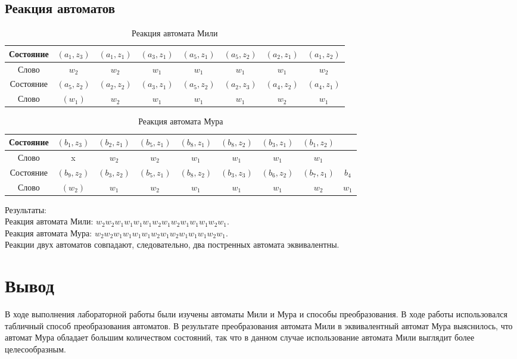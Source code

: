 \documentclass[a4paper,10pt]{article}
\begin{document}
        \subsection*{Реакция автоматов}
        \begin{table}[!h]
            \begin{tabular}{|c|c|c|c|c|c|c|c|}
                \hline
                Состояние & $(a_1, z_3)$& $(a_1, z_1)$ & $(a_3, z_1)$ & $(a_5, z_1)$& $(a_5, z_2)$ & $(a_2, z_1)$ & $(a_1, z_2)$\\ \hline
                Слово     & $w_2$       & $w_2$        & $w_1$ 		  & $w_1$		& $w_1$		   & $w_1$		  & $w_2$ 		\\ \hline
                Состояние & $(a_5,z_2)$ & $(a_2,z_2)$ & $(a_3,z_1)$ & $(a_5,z_2)$ & $(a_2,z_3)$ & $(a_4,z_2)$ & $(a_4,z_1)$ \\ \hline
                Слово     & $(w_1)$     & $w_2$       & $w_1$       & $w_1$       & $w_1$       & $w_2$       & $w_1$		\\ \hline
            \end{tabular}
            \caption{Реакция автомата Мили}
        \end{table}
        \begin{table}[!h]
            \begin{tabular}{|c|c|c|c|c|c|c|c|c|}
                \hline
                Состояние & $(b_1, z_3)$& $(b_2, z_1)$ & $(b_5, z_1)$ & $(b_8, z_1)$& $(b_8, z_2)$ & $(b_3, z_1)$ & $(b_1, z_2)$&		\\ \hline
                Слово     & x           & $w_2$        & $w_2$ 		  & $w_1$		& $w_1$		   & $w_1$		  & $w_1$ 		&		\\ \hline
                Состояние & $(b_9,z_2)$ & $(b_3,z_2)$  & $(b_5,z_1)$  & $(b_8,z_2)$ & $(b_3,z_3)$  & $(b_6,z_2)$  & $(b_7,z_1)$ & $b_4$ \\ \hline
                Слово     & $(w_2)$     & $w_1$        & $w_2$        & $w_1$       & $w_1$        & $w_1$        & $w_2$		& $w_1$ \\ \hline
            \end{tabular}
            \caption{Реакция автомата Мура}
        \end{table}

		Результаты: \\
        Реакция автомата Мили: $w_2 w_2 w_1 w_1 w_1 w_1 w_2 w_1 w_2 w_1 w_1 w_1 w_2 w_1$. \\
        Реакция автомата Мура: $w_2 w_2 w_1 w_1 w_1 w_1 w_2 w_1 w_2 w_1 w_1 w_1 w_2 w_1$. \\
		Реакции двух автоматов совпадают, следовательно, два постренных автомата эквивалентны.


\section*{Вывод}
    В ходе выполнения лабораторной работы были изучены автоматы Мили и Мура и способы преобразования. В ходе работы
    использовался табличный способ преобразования автоматов. В результате преобразования автомата Мили
    в эквивалентный автомат Мура выяснилось, что автомат Мура обладает большим количеством состояний, так что в данном
    случае использование автомата Мили выглядит более целесообразным.  
\end{document}
